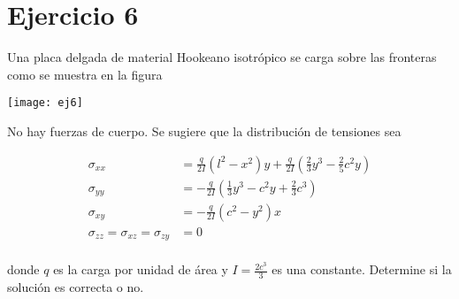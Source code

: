\documentclass[a4paper,10pt,twoside,final,spanish]{article}
\begin{document}
\section*{Ejercicio 6}

Una placa delgada de material Hookeano isotrópico se carga sobre las fronteras como 
se muestra en la figura

\begin{center}
\texttt{[image: ej6]}
\end{center}

No hay fuerzas de cuerpo. Se sugiere que la distribución de tensiones sea

\begin{align*}
\sigma_{xx} &= \frac{q}{2I}(l^{2}-x^{2})y+\frac{q}{2I}\left(
\frac{2}{3}y^{3}-\frac{2}{5}c^{2}y\right) \\
\sigma_{yy} &= -\frac{q}{2I}\left(\frac{1}{3}y^{3}-c^{2}y+\frac{2}{3}c^{3}\right) \\
\sigma_{xy} &= -\frac{q}{2I}(c^{2}-y^{2})x \\
\sigma_{zz}=\sigma_{xz}=\sigma_{zy} &= 0 \\
\end{align*}

donde $q$ es la carga por unidad de área y $I=\frac{2c^{3}}{3}$ es una constante. Determine si la solución es correcta o no. 

\dotfill
\end{document}
